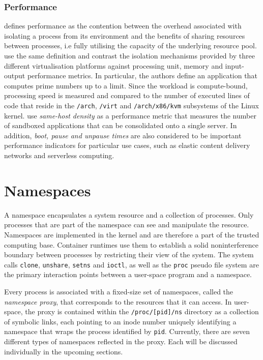 \subsubsection{Performance}
\label{sections:fundamentals/virtualisation/axioms/performance}
\textcite{10.1145/3365199} defines performance as the contention between the overhead associated 
with isolating a process from its environment and the benefits of sharing resources between processes,
i.e fully utilising the capacity of the underlying resource pool. 
\textcite{10.1145/3381052.3381315} use the same definition and contrast the isolation mechanisms provided
by three different virtualisation platforms against processing unit, memory and input-output performance metrics. 
In particular, the authors define an application that computes prime numbers up to a limit. 
Since the workload is compute-bound, processing speed is measured and compared to the
number of executed lines of code that reside in the \verb|/arch|, \verb|/virt| and \verb|/arch/x86/kvm|
subsystems of the Linux kernel. \textcite{10.1145/3132747.3132763} use \textit{same-host density} as a 
performance metric that measures the number of sandboxed applications that can be consolidated onto a single server.
In addition, \textit{boot, pause and unpause times} are also considered to be important performance indicators for particular 
use cases, such as elastic content delivery networks \cite{10.1145/3050748.3050757} \cite{10.1145/3132747.3132763}
and serverless computing.

\section{Namespaces}
\label{sections:fundamentals/namespaces}
A namespace encapsulates a system resource and a collection of processes. Only processes that are 
part of the namespace can see and manipulate the resource. Namespaces are implemented in the 
kernel and are therefore a part of the trusted computing base. Container runtimes use them 
to establish a solid noninterference boundary between processes by restricting their view of the system. 
The system calls \verb|clone|, \verb|unshare|, \verb|setns| and \verb|ioctl|, as well as the 
\verb|proc| pseudo file system are the primary interaction points between a user-space program and a namespace.  

Every process is associated with a fixed-size set of namespaces, called the \textit{namespace proxy}, that corresponds to the
resources that it can access.
In user-space, the proxy is contained within the \verb|/proc/[pid]/ns| directory as a 
collection of symbolic links, each pointing to an inode number uniquely identifying a namespace 
that wraps the process identified by \verb|pid|. Currently, there are seven different types 
of namespaces reflected in the proxy. Each will be discussed individually in the upcoming sections. 

